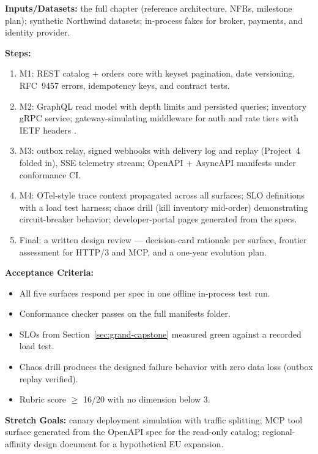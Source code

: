 \textbf{Inputs/Datasets:} the full chapter (reference architecture, NFRs,
milestone plan); synthetic Northwind datasets; in-process fakes for broker,
payments, and identity provider.

\textbf{Steps:}
\begin{enumerate}
  \item M1: REST catalog + orders core with keyset pagination, date
        versioning, RFC~9457 errors, idempotency keys, and contract tests.
  \item M2: GraphQL read model with depth limits and persisted queries;
        inventory gRPC service; gateway-simulating middleware for auth and
        rate tiers with IETF headers \cite{ietf_ratelimit_headers}.
  \item M3: outbox relay, signed webhooks with delivery log and replay
        (Project~4 folded in), SSE telemetry stream; OpenAPI + AsyncAPI
        manifests under conformance CI.
  \item M4: OTel-style trace context propagated across all surfaces; SLO
        definitions with a load test harness; chaos drill (kill inventory
        mid-order) demonstrating circuit-breaker behavior; developer-portal
        pages generated from the specs.
  \item Final: a written design review --- decision-card rationale per
        surface, frontier assessment for HTTP/3 and MCP, and a one-year
        evolution plan.
\end{enumerate}

\textbf{Acceptance Criteria:}
\begin{itemize}
  \item[$\square$] All five surfaces respond per spec in one offline
        in-process test run.
  \item[$\square$] Conformance checker passes on the full manifests folder.
  \item[$\square$] SLOs from Section~\ref{sec:grand-capstone} measured green
        against a recorded load test.
  \item[$\square$] Chaos drill produces the designed failure behavior with
        zero data loss (outbox replay verified).
  \item[$\square$] Rubric score $\geq$ 16/20 with no dimension below 3.
\end{itemize}

\textbf{Stretch Goals:} canary deployment simulation with traffic splitting;
MCP tool surface generated from the OpenAPI spec for the read-only catalog;
regional-affinity design document for a hypothetical EU expansion.

